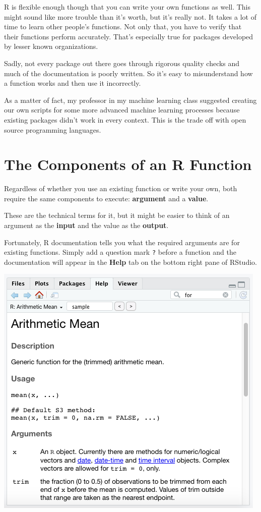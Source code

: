 \documentclass[
]{book}
\begin{document}
\begin{center}
R is flexible enough though that you can write your own functions as well. This might sound like more trouble than it's worth, but it's really not. It takes a lot of time to learn other people's functions. Not only that, you have to verify that their functions perform accurately. That's especially true for packages developed by lesser known organizations.

Sadly, not every package out there goes through rigorous quality checks and much of the documentation is poorly written. So it's easy to misunderstand how a function works and then use it incorrectly.

As a matter of fact, my professor in my machine learning class suggested creating our own scripts for some more advanced machine learning processes because existing packages didn't work in every context. This is the trade off with open source programming languages.

\hypertarget{the-components-of-an-r-function}{%
\section{The Components of an R Function}\label{the-components-of-an-r-function}}

Regardless of whether you use an existing function or write your own, both require the same components to execute: \textbf{argument} and a \textbf{value}.

These are the technical terms for it, but it might be easier to think of an argument as the \textbf{input} and the value as the \textbf{output}.

Fortunately, R documentation tells you what the required arguments are for existing functions. Simply add a question mark \texttt{?} before a function and the documentation will appear in the \textbf{Help} tab on the bottom right pane of RStudio.

\begin{center}\includegraphics[width=0.5\linewidth]{1.48_Function_Documentation} \end{center}


\end{center}
\end{document}
